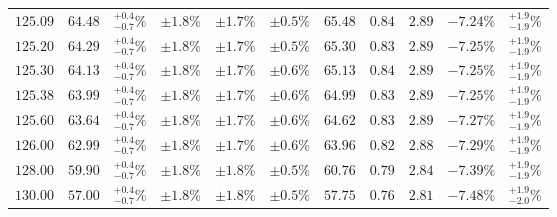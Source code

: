 \begin{table}[ht!]
{{\begin{tabular}{| cc | c | ccc | cccc | c |}
$125.09$ & $64.48$ & $^{+0.4}_{-0.7}\%$ & $\pm 1.8\%$ & {\color{black!55}$\pm 1.7\%$} & {\color{black!55}$\pm 0.5\%$} & $65.48$ & $0.84$ & $2.89$ & $-7.24\%$ & $^{+1.9}_{-1.9}\%$ \\
$125.20$ & $64.29$ & $^{+0.4}_{-0.7}\%$ & $\pm 1.8\%$ & {\color{black!55}$\pm 1.7\%$} & {\color{black!55}$\pm 0.5\%$} & $65.30$ & $0.83$ & $2.89$ & $-7.25\%$ & $^{+1.9}_{-1.9}\%$ \\
$125.30$ & $64.13$ & $^{+0.4}_{-0.7}\%$ & $\pm 1.8\%$ & {\color{black!55}$\pm 1.7\%$} & {\color{black!55}$\pm 0.6\%$} & $65.13$ & $0.84$ & $2.89$ & $-7.25\%$ & $^{+1.9}_{-1.9}\%$ \\
$125.38$ & $63.99$ & $^{+0.4}_{-0.7}\%$ & $\pm 1.8\%$ & {\color{black!55}$\pm 1.7\%$} & {\color{black!55}$\pm 0.6\%$} & $64.99$ & $0.83$ & $2.89$ & $-7.25\%$ & $^{+1.9}_{-1.9}\%$ \\
$125.60$ & $63.64$ & $^{+0.4}_{-0.7}\%$ & $\pm 1.8\%$ & {\color{black!55}$\pm 1.7\%$} & {\color{black!55}$\pm 0.6\%$} & $64.62$ & $0.83$ & $2.89$ & $-7.27\%$ & $^{+1.9}_{-1.9}\%$ \\
$126.00$ & $62.99$ & $^{+0.4}_{-0.7}\%$ & $\pm 1.8\%$ & {\color{black!55}$\pm 1.7\%$} & {\color{black!55}$\pm 0.6\%$} & $63.96$ & $0.82$ & $2.88$ & $-7.29\%$ & $^{+1.9}_{-1.9}\%$ \\
$128.00$ & $59.90$ & $^{+0.4}_{-0.7}\%$ & $\pm 1.8\%$ & {\color{black!55}$\pm 1.8\%$} & {\color{black!55}$\pm 0.5\%$} & $60.76$ & $0.79$ & $2.84$ & $-7.39\%$ & $^{+1.9}_{-1.9}\%$ \\
$130.00$ & $57.00$ & $^{+0.4}_{-0.7}\%$ & $\pm 1.8\%$ & {\color{black!55}$\pm 1.8\%$} & {\color{black!55}$\pm 0.5\%$} & $57.75$ & $0.76$ & $2.81$ & $-7.48\%$ & $^{+1.9}_{-2.0}\%$ \\
\cline{1-11}
\end{tabular}
}
}
\end{table}


